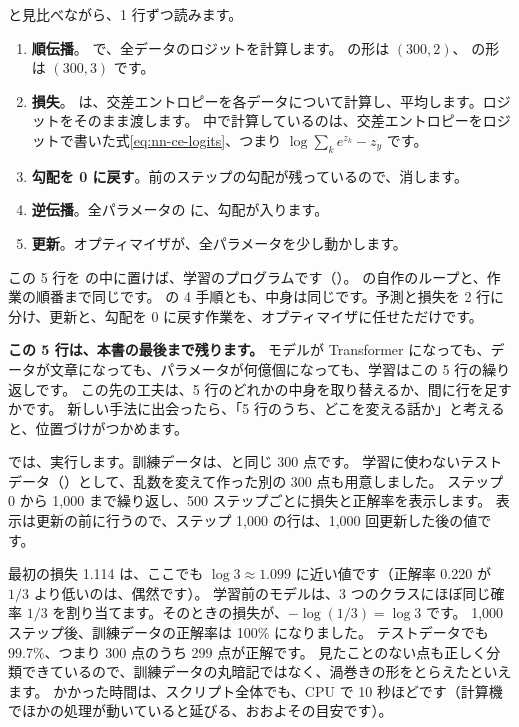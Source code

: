 
と見比べながら、1 行ずつ読みます。
\begin{enumerate}
\item \textbf{順伝播}。 で、全データのロジットを計算します。 の形は $(300,2)$、 の形は $(300,3)$ です。
\item \textbf{損失}。 は、交差エントロピーを各データについて計算し、平均します。ロジットをそのまま渡します。
中で計算しているのは、交差エントロピーをロジットで書いた式\eqref{eq:nn-ce-logits}、つまり $\log\sum_k e^{z_k}-z_y$ です。
\item \textbf{勾配を 0 に戻す}。前のステップの勾配が残っているので、消します。
\item \textbf{逆伝播}。全パラメータの  に、勾配が入ります。
\item \textbf{更新}。オプティマイザが、全パラメータを少し動かします。
\end{enumerate}
この 5 行を  の中に置けば、学習のプログラムです（）。
の自作のループと、作業の順番まで同じです。
の 4 手順とも、中身は同じです。予測と損失を 2 行に分け、更新と、勾配を 0 に戻す作業を、オプティマイザに任せただけです。

\textbf{この 5 行は、本書の最後まで残ります。}
モデルが Transformer になっても、データが文章になっても、パラメータが何億個になっても、学習はこの 5 行の繰り返しです。
この先の工夫は、5 行のどれかの中身を取り替えるか、間に行を足すかです。
新しい手法に出会ったら、「5 行のうち、どこを変える話か」と考えると、位置づけがつかめます。

では、実行します。訓練データは、と同じ 300 点です。
学習に使わないテストデータ（）として、乱数を変えて作った別の 300 点も用意しました。
ステップ 0 から 1,000 まで繰り返し、500 ステップごとに損失と正解率を表示します。
表示は更新の前に行うので、ステップ 1,000 の行は、1,000 回更新した後の値です。


最初の損失 1.114 は、ここでも $\log3\approx1.099$ に近い値です（正解率 0.220 が $1/3$ より低いのは、偶然です）。
学習前のモデルは、3 つのクラスにほぼ同じ確率 $1/3$ を割り当てます。そのときの損失が、$-\log(1/3)=\log 3$ です。
1,000 ステップ後、訓練データの正解率は 100\% になりました。
テストデータでも 99.7\%、つまり 300 点のうち 299 点が正解です。
見たことのない点も正しく分類できているので、訓練データの丸暗記ではなく、渦巻きの形をとらえたといえます。
かかった時間は、スクリプト全体でも、CPU で 10 秒ほどです（計算機でほかの処理が動いていると延びる、おおよその目安です）。

